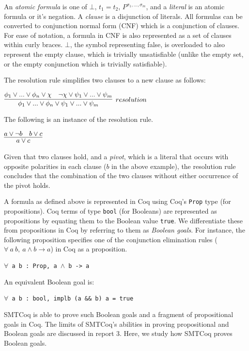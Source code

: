 \documentclass[11pt]{article}
\begin{document}
	An \textit{atomic formula} is one 
	of $\bot$, $t_1 = t_2$, 
	$P^{\sigma_1,...,\sigma_m}$, and a 
	\textit{literal} is an atomic 
	formula or it's negation. 
	A \textit{clause} is a 
	disjunction of literals. All formulas 
	can be converted to conjunction normal 
	form (CNF) which is a conjunction of 
	clauses. For ease of notation, 
	a formula in CNF is also represented
	as a set of clauses within curly 
	braces. $\bot$, the symbol
	representing false, 
	is overloaded to also represent
	the empty clause, which is trivially
	unsatisfiable (unlike the empty set,
	or the empty conjunction which is 
	trivially satisfiable).
	
	\noindent The resolution rule
	simplifies two 
	clauses to a new clause as follows:
	\begin{center}
		$\infer[resolution]{\phi_1 \lor ... \lor 
			\phi_n \lor \psi_1 \lor ... \lor 
			\psi_m}{\phi_1 \lor ... \lor \phi_n 
			\lor \chi & \neg \chi \lor \psi_1 
			\lor ... \lor \psi_m}$ 
	\end{center}
	The following is an instance of the 
	resolution rule.
	\begin{center}
		$\infer{a \lor c}{a \lor \neg b 
			& b \lor c}$
	\end{center}
	Given that two clauses hold, 
	and a \textit{pivot}, which is a 
	literal that occurs with opposite 
	polarities in each clause ($b$ in 
	the above example), the resolution 
	rule concludes that 
	the combination of the two clauses 
	without either occurrence of the 
	pivot holds.
	
	A formula as defined above is 
	represented in Coq using Coq's
	\texttt{Prop} type (for 
	propositions). Coq terms 
	of type \texttt{bool} (for 
	Booleans) are represented as 
	propositions by equating them 
	to the Boolean value \texttt{true}.
	We differentiate these from 
	propositions in Coq by referring to 
	them as \textit{Boolean goals}.
	For instance, the following 
	proposition specifies one of the 
	conjunction elimination rules
	($\forall\ a\ b,\ a \land b \to a$) in 
	Coq as a proposition.
	\begin{center}
		\texttt{$\forall$ a b : Prop,
			a $\land$ b -> a}
	\end{center}
	An equivalent Boolean goal is:
	\begin{center}
		\texttt{$\forall$ a b : bool,
			implb (a \&\& b) a = true}
	\end{center}
	SMTCoq is able to prove such Boolean 
	goals and a fragment of propositional
	goals in Coq. The limits of SMTCoq's 
	abilities in proving propositional and 
	Boolean goals are discussed in report 3. 
	Here, we study how SMTCoq proves Boolean 
	goals. 
	
\end{document}
